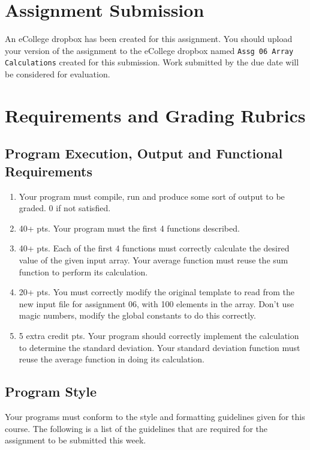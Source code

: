 \documentclass[11pt]{article}
\begin{document}
\section*{Assignment Submission}
\label{sec-4}

An eCollege dropbox has been created for this assignment.  You should
upload your version of the assignment to the eCollege dropbox named
\verb~Assg 06 Array Calculations~ created for this submission.  Work
submitted by the due date will be considered for evaluation.
\section*{Requirements and Grading Rubrics}
\label{sec-5}

\subsection*{Program Execution, Output and Functional Requirements}
\label{sec-5-1}

\begin{enumerate}
\item Your program must compile, run and produce some sort of output to be
graded. 0 if not satisfied.
\item 40+ pts.  Your program must the first 4 functions described.
\item 40+ pts. Each of the first 4 functions must correctly calculate the desired
value of the given input array.  Your average function must reuse the sum
function to perform its calculation.
\item 20+ pts. You must correctly modify the original template to read from the new
input file for assignment 06, with 100 elements in the array.  Don't use
magic numbers, modify the global constants to do this correctly.
\item 5 extra credit pts. Your program should correctly implement the calculation to
determine the standard deviation.  Your standard deviation function must reuse
the average function in doing its calculation.
\end{enumerate}

\subsection*{Program Style}
\label{sec-5-2}

Your programs must conform to the style and formatting guidelines
given for this course.  The following is a list of the guidelines that
are required for the assignment to be submitted this week.
\end{document}
